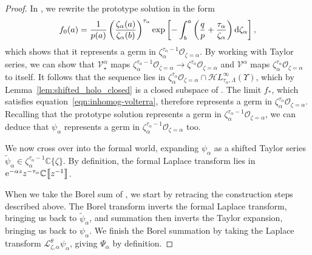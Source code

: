 \documentclass[pdftex]{sigma}
\newcommand{\singexp}[2]{\mathcal{H}L^\infty_{#1, #2}}
\newcommand{\C}{\mathbb{C}}
\newcommand{\volterra}{\mathcal{V}}
\newcommand{\softpart}{\mathcal{V}_\star}
\newcommand{\solproto}{f_0}
\newcommand{\solptb}{f_\star}
\newcommand{\series}[1]{\tilde{#1}}
\newcommand{\laplace}{\mathcal{L}}
\numberwithin{equation}{section}
\begin{document}
\begin{proof}
In \cite[Section~3.2.1]{reg-sing-volterra}, we rewrite the prototype solution in the form
\[ \solproto(a) = \frac{1}{p(a)} \left(\frac{\zeta_\alpha(a)}{\zeta_\alpha(b)}\right)^{\tau_\alpha} \exp\left[-\int_b^a \left( \frac{q}{p} + \frac{\tau_\alpha}{\zeta_\alpha} \right) {\rm d}\zeta_\alpha\right], \]
which shows that it represents a germ in $\zeta_\alpha^{\tau_\alpha-1} \mathcal{O}_{\zeta = \alpha}$. By working with Taylor series, we can show that $\softpart^\alpha$ maps
$\zeta_\alpha^{\tau_\alpha-1} \mathcal{O}_{\zeta=\alpha} \to \zeta^{\tau_\alpha} \mathcal{O}_{\zeta=\alpha} $
and $\volterra^\alpha$ maps $\zeta_\alpha^{\tau_\alpha} \mathcal{O}_{\zeta=\alpha}$ to itself. It follows that the sequence \smash{$\solptb^{(0)}, \solptb^{(1)}, \solptb^{(2)}, \dots$} lies in $\zeta_\alpha^{\tau_\alpha} \mathcal{O}_{\zeta=\alpha} \cap \singexp{\tau_\alpha}{\Lambda}(\Upsilon)$, which by Lemma~\ref{lem:shifted_holo_closed} is a closed subspace of \smash{$\singexp{\tau_\alpha}{\Lambda}(\Upsilon)$}. The limit $f_*$, which satisfies equation~\eqref{eqn:inhomog-volterra}, therefore represents a germ in $\zeta_\alpha^{\tau_\alpha} \mathcal{O}_{\zeta = \alpha}$. Recalling that the prototype solution represents a germ in $\zeta_\alpha^{\tau_\alpha-1} \mathcal{O}_{\zeta = \alpha}$, we can deduce that $\psi_\alpha$ represents a germ in $\zeta_\alpha^{\tau_\alpha-1} \mathcal{O}_{\zeta = \alpha}$ too.

We now cross over into the formal world, expanding $\psi_\alpha$ as a shifted Taylor series $\series{\psi}_\alpha \in \zeta_\alpha^{\tau_\alpha-1} \C\{\zeta\}$. By definition, the formal Laplace transform \smash{$\series{\Psi}_\alpha = \laplace_{\zeta, \alpha} \series{\psi}_\alpha$} lies in ${\rm e}^{-\alpha z} z^{-\tau_\alpha} \C \big\llbracket z^{-1} \big\rrbracket$.

When we take the Borel sum of \smash{$\series{\Psi}_\alpha$}, we start by retracing the construction steps described above. The Borel transform inverts the formal Laplace transform, bringing us back to $\series{\psi}_\alpha$, and summation then inverts the Taylor expansion, bringing us back to $\psi_\alpha$. We finish the Borel summation by taking the Laplace transform $\laplace^\theta_{\zeta, \alpha} \psi_\alpha$, giving $\Psi_\alpha$ by definition.
\end{proof}
\end{document}
